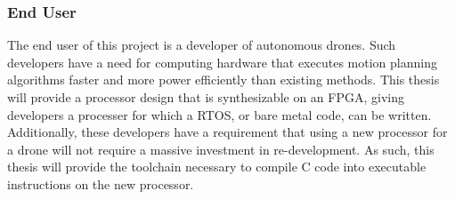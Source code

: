     \subsubsection*{End User}
    The end user of this project is a developer of autonomous drones. Such developers have a need for computing hardware that executes motion planning algorithms faster and more power efficiently than existing methods. This thesis will provide a processor design that is synthesizable on an \ac{FPGA}, giving developers a processer for which a \ac{RTOS}, or bare metal code, can be written. 
    Additionally, these developers have a requirement that using a new processor for a drone will not require a massive investment in re-development. As such, this thesis will provide the toolchain necessary to compile C code into executable instructions on the new processor.
